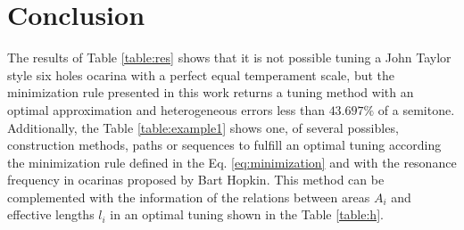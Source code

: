 \documentclass[11pt,twocolumn]{article}
\begin{document}
\begin{table}[h]
\center
{}
\caption{Proposed tuning method.}
\label{table:example1}
\end{table}


\section{Conclusion}
The results of Table \ref{table:res} shows that it is not possible tuning a John Taylor style six holes ocarina with a perfect equal temperament scale,
but the minimization rule presented in this work returns a tuning method with an optimal approximation and heterogeneous errors less than $43.697\%$ of a semitone.
Additionally, the Table \ref{table:example1} shows one, of several possibles, construction methods, 
paths or sequences to fulfill an optimal tuning according the minimization rule defined in the Eq. \ref{eq:minimization} and with 
the resonance frequency in ocarinas proposed by Bart Hopkin.
This method can be complemented with the information of the relations between areas $A_i$ and effective lengths $l_i$ 
in an optimal tuning shown in the Table \ref{table:h}.


\printbibliography


\end{document}
